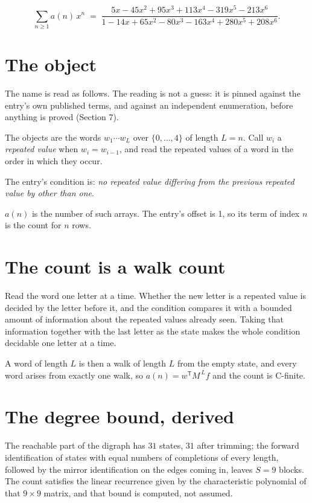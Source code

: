 \documentclass[11pt]{article}
\theoremstyle{definition}
\begin{document}
\[\sum_{n \ge 1} a(n)\,x^n \;=\; \frac{5x - 45x^{2} + 95x^{3} + 113x^{4} - 319x^{5} - 213x^{6}}{1 - 14x + 65x^{2} - 80x^{3} - 163x^{4} + 280x^{5} + 208x^{6}}.\]

\section{The object}

The name is read as follows. The reading is not a guess: it is pinned against the entry's own published terms, and against an independent enumeration, before anything is proved (Section 7).

The objects are the words $w_1\cdots w_L$ over $\{0,\dots,4\}$ of length $L = n$. Call $w_i$ a {\itshape repeated value} when $w_i = w_{i-1}$, and read the repeated values of a word in the order in which they occur.

The entry's condition is: {\itshape no repeated value differing from the previous repeated value by other than one}.

$a(n)$ is the number of such arrays. The entry's offset is 1, so its term of index $n$ is the count for $n$ rows.

\section{The count is a walk count}

Read the word one letter at a time. Whether the new letter is a repeated value is decided by the letter before it, and the condition compares it with a bounded amount of information about the repeated values already seen. Taking that information together with the last letter as the state makes the whole condition decidable one letter at a time.

A word of length $L$ is then a walk of length $L$ from the empty state, and every word arises from exactly one walk, so $a(n) = w^{\mathsf T}M^{\,L}f$ and the count is C-finite.

\section{The degree bound, derived}

The reachable part of the digraph has $31$ states, $31$ after trimming; the forward identification of states with equal numbers of completions of every length, followed by the mirror identification on the edges coming in, leaves $S = 9$ blocks. The count satisfies the linear recurrence given by the characteristic polynomial of that $9\times9$ matrix, and that bound is computed, not assumed.
\end{document}
